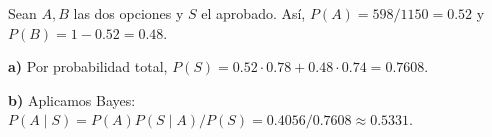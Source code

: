 Sean $A,B$ las dos opciones y $S$ el aprobado.
Así, $P(A)=598/1150=0.52$ y $P(B)=1-0.52=0.48$.

\textbf{a)} Por probabilidad total,
$P(S)=0.52\cdot0.78+0.48\cdot0.74=\boxed{0.7608}$.

\textbf{b)} Aplicamos Bayes:
$P(A\mid S)=P(A)P(S\mid A)/P(S)=0.4056/0.7608
\approx\boxed{0.5331}$.
